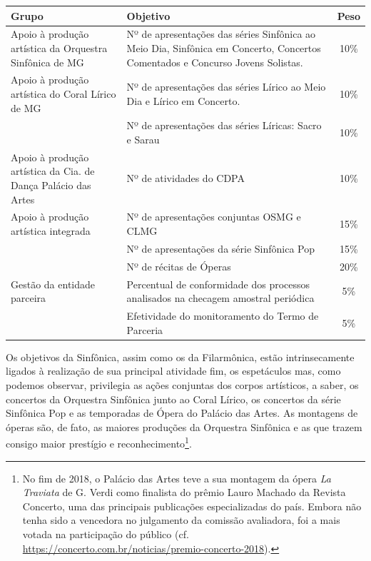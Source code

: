 \documentclass[a4paper, 12pt, openright, oneside, german, french, english, brazil]{abntex2}
\begin{document}
	
	\begin{table}[!h]
		{\begin{tabular}{p{6cm} p{7cm} c}
				\hline
				\textbf{Grupo}  & \textbf{Objetivo} & \textbf{Peso} \\
				\hline
				Apoio à produção artística da Orquestra Sinfônica de MG & Nº de apresentações das séries Sinfônica ao Meio Dia, Sinfônica em Concerto, Concertos Comentados e Concurso Jovens Solistas. & 10\% \\
				\hline
				Apoio à produção artística do Coral Lírico de MG & Nº de apresentações das séries Lírico ao Meio Dia e Lírico em Concerto. & 10\% \\
				 & Nº de apresentações das séries Líricas: Sacro e Sarau & 10\% \\
				\hline
				Apoio à produção artística da Cia. de Dança Palácio das Artes & Nº de atividades do CDPA & 10\% \\
				\hline
				Apoio à produção artística integrada & Nº de apresentações conjuntas OSMG e CLMG & 15\% \\
				   & Nº de apresentações da série Sinfônica Pop & 15\% \\
				   & Nº de récitas de Óperas & 20\% \\
				\hline
				Gestão da entidade parceira & Percentual de conformidade dos processos analisados na checagem amostral periódica & 5\% \\
				   & Efetividade do monitoramento do Termo de Parceria & 5\% \\
				\hline				
			\end{tabular}
	}
		{}
	\end{table}


	Os objetivos da Sinfônica, assim como os da Filarmônica, estão intrinsecamente ligados à realização de sua principal atividade fim, os espetáculos mas, como podemos observar, privilegia as ações conjuntas dos corpos artísticos, a saber, os concertos da Orquestra Sinfônica junto ao Coral Lírico, os concertos da série Sinfônica Pop e as temporadas de Ópera do Palácio das Artes. As montagens de óperas são, de fato, as maiores produções da Orquestra Sinfônica e as que trazem consigo maior prestígio e reconhecimento\footnote{No fim de 2018, o Palácio das Artes teve a sua montagem da ópera \textit{La Traviata} de G. Verdi como finalista do prêmio Lauro Machado da Revista Concerto, uma das principais publicações especializadas do país. Embora não tenha sido a vencedora no julgamento da comissão avaliadora, foi a mais votada na participação do público (cf. \url{https://concerto.com.br/noticias/premio-concerto-2018}).}.
	
\end{document}
